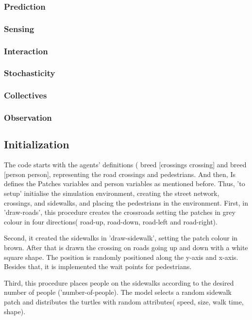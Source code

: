 \documentclass[10pt]{report}
\numberwithin{figure}{section}
\numberwithin{table}{section}
\begin{document}
\subsubsection{Prediction}

\subsubsection{Sensing}

\subsubsection{Interaction}

\subsubsection{Stochasticity}

\subsubsection{Collectives}

\subsubsection{Observation}

\subsection{Initialization}

The code starts with the agents' definitions ( breed [crossings crossing] and breed [person person], representing the road crossings and pedestrians. And then, Is defines the Patches variables and person variables as mentioned before. Thus, 'to setup' initialise the simulation environment, creating the street network, crossings, and sidewalks, and placing the pedestrians in the environment. First, in 'draw-roads', this procedure creates the crossroads setting the patches in grey colour in four directions( road-up, road-down, road-left and road-right). 

Second, it created the sidewalks in 'draw-sidewalk', setting the patch colour in brown. After that is drawn the crossing on roads going up and down with a white square shape. The position is randomly positioned along the y-axis and x-axis. Besides that, it is implemented the wait points for pedestrians.

Third, this procedure places people on the sidewalks according to the desired number of people ('number-of-people). The model selects a random sidewalk patch and distributes the turtles with random attributes( speed, size, walk time, shape).
\end{document}
